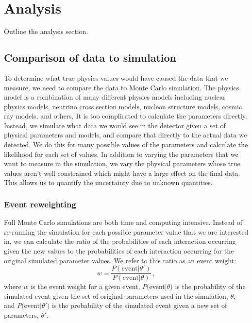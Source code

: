 \section{Analysis}\label{sec:analysis}
\hspace{\parindent}
Outline the analysis section.

\subsection{Comparison of data to simulation}
  To determine what true physics values would have caused the data that we
  measure, we need to compare the data to Monte Carlo simulation. The physics
  model is a combination of many different physics models including nuclear
  physics models, neutrino cross section models, nucleon structure models,
  cosmic ray models, and others. It is too complicated to calculate the
  parameters directly. Instead, we simulate what data we would see in the
  detector given a set of physical parameters and models, and compare that
  directly to the actual data we detected. We do this for many possible values
  of the parameters and calculate the likelihood for each set of values. In
  addition to varying the parameters that we want to measure in the simulation,
  we vary the physical parameters whose true values aren't well constrained
  which might have a large effect on the final data. This allows us to quantify
  the uncertainty due to unknown quantities.
  \subsubsection{Event reweighting}\label{sec:reweighting}
    Full Monte Carlo simulations are both time and computing intensive. Instead
    of re-running the simulation for each possible parameter value that we are
    interested in, we can calculate the ratio of the probabilities of each
    interaction occurring given the new values to the probabilities of each
    interaction occurring for the original simulated parameter values. We refer
    to this ratio as an event weight:
    \begin{equation}
      w = \frac{P(\textrm{event}|\theta')}{P(\textrm{event}|\theta)} \,,
    \end{equation}
    where $w$ is the event weight for a given event, $P($event$|\theta)$ is the
    probability of the simulated event given the set of original parameters
    used in the simulation, $\theta$, and $P($event$|\theta')$ is the
    probability of the simulated event given a new set of parameters,
    $\theta'$.

